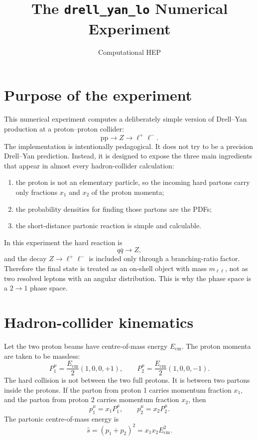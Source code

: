 \documentclass[11pt]{article}
\title{The \texttt{drell\_yan\_lo} Numerical Experiment}
\author{Computational HEP}
\date{}
\newcommand{\pp}{\mathrm{p}}
\newcommand{\mll}{m_{\ell\ell}}
\newcommand{\shat}{\hat s}
\newcommand{\ecm}{E_{\mathrm{cm}}}
\begin{document}
\maketitle

\section{Purpose of the experiment}

This numerical experiment computes a deliberately simple version of
Drell--Yan production at a proton--proton collider:
\[
  \pp\pp \to Z \to \ell^+\ell^- .
\]
The implementation is intentionally pedagogical.  It does not try to be a
precision Drell--Yan prediction.  Instead, it is designed to expose the three
main ingredients that appear in almost every hadron-collider calculation:
\begin{enumerate}
  \item the proton is not an elementary particle, so the incoming hard partons
        carry only fractions \(x_1\) and \(x_2\) of the proton momenta;
  \item the probability densities for finding those partons are the PDFs;
  \item the short-distance partonic reaction is simple and calculable.
\end{enumerate}
In this experiment the hard reaction is
\[
  q \bar q \to Z ,
\]
and the decay \(Z \to \ell^+\ell^-\) is included only through a branching-ratio
factor.  Therefore the final state is treated as an on-shell object with mass
\(\mll\), not as two resolved leptons with an angular distribution.  This is why
the phase space is a \(2\to1\) phase space.

\section{Hadron-collider kinematics}

Let the two proton beams have centre-of-mass energy \(\ecm\).  The proton
momenta are taken to be massless:
\[
  P_1^\mu = \frac{\ecm}{2}(1,0,0,+1), \qquad
  P_2^\mu = \frac{\ecm}{2}(1,0,0,-1).
\]
The hard collision is not between the two full protons.  It is between two
partons inside the protons.  If the parton from proton 1 carries momentum
fraction \(x_1\), and the parton from proton 2 carries momentum fraction
\(x_2\), then
\[
  p_1^\mu = x_1 P_1^\mu, \qquad p_2^\mu = x_2 P_2^\mu .
\]
The partonic centre-of-mass energy is
\[
  \shat = (p_1+p_2)^2 = x_1 x_2 \ecm^2 .
\]
\end{document}
